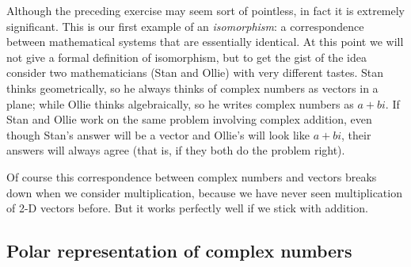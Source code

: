Although the preceding exercise may seem sort of pointless, in fact it is extremely significant. This is our first example of an \emph{isomorphism}: a correspondence between mathematical systems that are essentially identical. At this point we will not give a formal definition of isomorphism, but 
to get the gist of the idea consider two mathematicians (Stan and Ollie) with very different tastes. Stan thinks geometrically, so he always thinks of complex numbers as vectors in a plane; while Ollie thinks algebraically, so he writes complex numbers as $a + bi$. If Stan and Ollie work on the same problem involving complex addition, even though Stan's answer will be a vector and Ollie's will look like $a + bi$, their answers will always agree (that is, if they both do the problem right).



Of course this correspondence between complex numbers and vectors breaks down when we consider multiplication, because we have never seen multiplication of 2-D vectors before. But it works perfectly well if we stick with addition.

\subsection{Polar representation of complex numbers}

